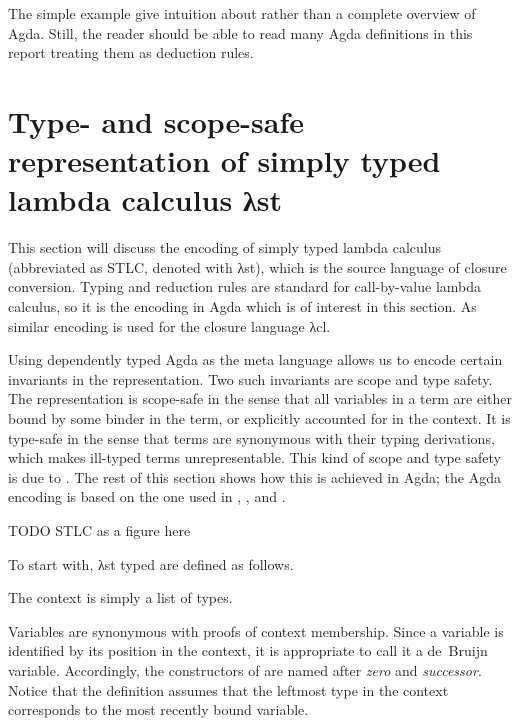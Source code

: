 \documentclass[bsc,frontabs,oneside,singlespacing,parskip,deptreport]{infthesis}
\theoremstyle{definition}
\theoremstyle{lemma}
\begin{document}
The simple example give intuition about rather than a complete
overview of Agda. Still, the reader should be able to read many Agda
definitions in this report treating them as deduction rules.

\section{Type- and scope-safe representation of simply typed lambda
  calculus λst}
\label{sec:type-scope-safe}

This section will discuss the encoding of simply typed lambda calculus
(abbreviated as STLC, denoted with λst), which is the source language
of closure conversion. Typing and reduction rules are standard for
call-by-value lambda calculus, so it is the encoding in Agda which is
of interest in this section. As similar encoding is used for the
closure language λcl.

Using dependently typed Agda as the meta language allows us to encode
certain invariants in the representation. Two such invariants are
scope and type safety. The representation is scope-safe in the sense
that all variables in a term are either bound by some binder in the
term, or explicitly accounted for in the context. It is type-safe in
the sense that terms are synonymous with their typing derivations,
which makes ill-typed terms unrepresentable. This kind of scope and
type safety is due to \cite{DBLP:conf/csl/AltenkirchR99}. The rest of
this section shows how this is achieved in Agda; the Agda encoding is
based on the one used in \cite{DBLP:conf/cpp/Allais0MM17},
\cite{DBLP:journals/pacmpl/AllaisA0MM18}, and
\cite{DBLP:conf/sbmf/Wadler18}.

TODO STLC as a figure here

To start with, λst typed are defined as follows.


The context is simply a list of types.


Variables are synonymous with proofs of context membership. Since a
variable is identified by its position in the context, it is
appropriate to call it a de~Bruijn variable. Accordingly, the
constructors of  are named after \textit{zero} and
\textit{successor}. Notice that the definition assumes that the
leftmost type in the context corresponds to the most recently bound
variable.
\end{document}
